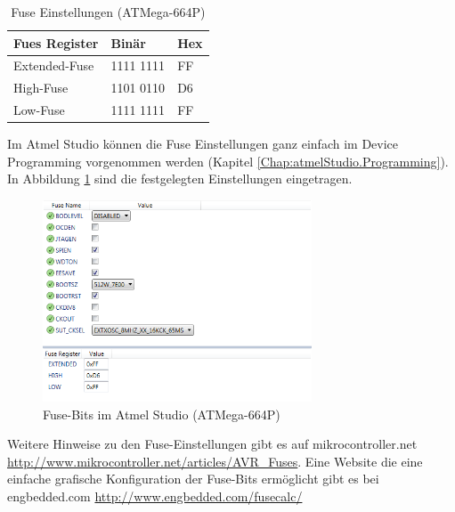 \begin{table}[H]
\centering
\begin{tabular}{|l|l|l|} \hline
Fues Register & Binär & Hex\\ \hline
Extended-Fuse & 1111 1111 & FF\\ \hline
High-Fuse & 1101 0110 & D6\\ \hline
Low-Fuse & 1111 1111 & FF\\ \hline
\end{tabular}
\caption{Fuse Einstellungen (ATMega-664P)}
\label{fuses-result}
\end{table}

Im Atmel Studio können die Fuse Einstellungen ganz einfach im Device Programming
vorgenommen werden (Kapitel \ref{Chap:atmelStudio.Programming}). In Abbildung
\ref{fuses-graf} sind die festgelegten Einstellungen eingetragen.

\begin{figure}[h]
\centering
\includegraphics[width=8cm]{content/pictures/Fusebits/fusebits_atmelstudio.png}
\caption{Fuse-Bits im Atmel Studio (ATMega-664P)}
\label{fuses-graf}
\end{figure}

Weitere Hinweise zu den Fuse-Einstellungen gibt es auf mikrocontroller.net
\url{http://www.mikrocontroller.net/articles/AVR_Fuses}.
Eine Website die eine einfache grafische Konfiguration der Fuse-Bits ermöglicht
gibt es bei engbedded.com \url{http://www.engbedded.com/fusecalc/}

